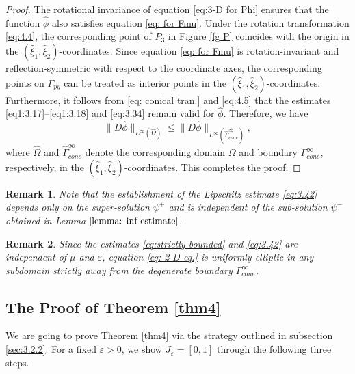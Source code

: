 \documentclass[reqno,12pt]{amsart}
\newtheorem{remark}{Remark}[section]
\numberwithin{equation}{section}
\begin{document}
\begin{proof}
    The rotational invariance of equation \eqref{eq:3-D for Phi} ensures that the function $\hat{\phi}$ also satisfies equation \eqref{eq: for Fmu}. Under the rotation transformation \eqref{eq:4.4}, the corresponding point of $P_3$ in Figure \ref{fg P} coincides with the origin in the $(\hat{\xi}_{1},\hat{\xi}_{2})$-coordinates. Since equation \eqref{eq: for Fmu} is rotation-invariant and reflection-symmetric with respect to the coordinate axes, the corresponding points on $\Gamma_{py}$ can be treated as interior points in the $(\hat{\xi}_{1},\hat{\xi}_{2})$-coordinates. Furthermore, it follows from \eqref{eq: conical tran.} and \eqref{eq:4.5} that the estimates \eqref{eq1:3.17}--\eqref{eq1:3.18} and \eqref{eq:3.34} remain valid for $\hat{\phi}$. Therefore, we have
   	\begin{equation}\label{eq1:3.11}
		\|D\hat{\phi}\|_{L^{\infty}(\hat{\Omega})}\leq \|D\hat{\phi}\|_{L^{\infty}(\overline{\hat{\Gamma}_{cone}^{\infty}})},
	\end{equation} 
    where $\hat{\Omega}$ and $\hat{\Gamma}_{cone}^{\infty}$ denote the corresponding domain $\Omega$ and boundary $\Gamma_{cone}^{\infty}$, respectively, in the $(\hat{\xi}_{1},\hat{\xi}_{2})$-coordinates. This completes the proof.
\end{proof}

\begin{remark}\label{remark:lip on supsolution}
 Note that the establishment of the Lipschitz estimate \eqref{eq:3.42} depends only on the super-solution $\psi^+$ and is independent of the sub-solution $\psi^-$ obtained in Lemma $\ref{lemma: inf-estimate}$.
\end{remark}

\begin{remark}\label{remark:local uniform ellipticity}
Since the estimates \eqref{eq:strictly bounded} and \eqref{eq:3.42} are independent of $\mu$ and $\varepsilon$, equation \eqref{eq: 2-D eq.} is uniformly elliptic in any subdomain strictly away from the degenerate boundary $\Gamma_{cone}^{\infty}$.
\end{remark}


 
\subsection{The Proof of Theorem \ref{thm4}}\label{sec:3.2.5}
We are going to prove Theorem \ref{thm4} via the strategy outlined in subsection \ref{sec:3.2.2}. For a fixed $\varepsilon>0$, we show $J_{\varepsilon}=[0,1]$ through the following three steps.
\end{document}
